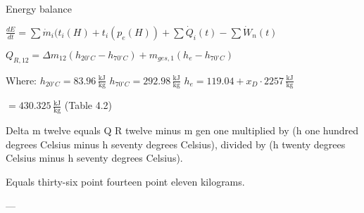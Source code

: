 Energy balance  

\( \frac{dE}{dt} = \sum \dot{m}_i(t_i(H) + t_i(p_e(H)) + \sum \dot{Q}_i(t) - \sum \dot{W}_n(t) \)  

\( Q_{R,12} = \Delta m_{12}(h_{20^\circ C} - h_{70^\circ C}) + m_{ges,1}(h_e - h_{70^\circ C}) \)  

Where:  
\( h_{20^\circ C} = 83.96 \, \frac{\text{kJ}}{\text{kg}} \)  
\( h_{70^\circ C} = 292.98 \, \frac{\text{kJ}}{\text{kg}} \)  
\( h_e = 119.04 + x_D \cdot 2257 \, \frac{\text{kJ}}{\text{kg}} \)  

\( = 430.325 \, \frac{\text{kJ}}{\text{kg}} \)  
(Table 4.2)

Delta m twelve equals Q R twelve minus m gen one multiplied by (h one hundred degrees Celsius minus h seventy degrees Celsius), divided by (h twenty degrees Celsius minus h seventy degrees Celsius).  

Equals thirty-six point fourteen point eleven kilograms.  

---